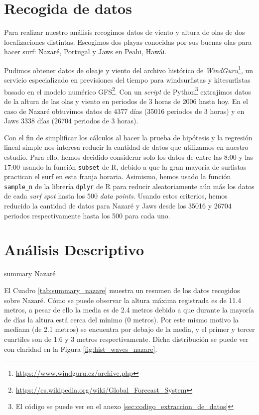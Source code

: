 \section{Recogida de datos}%
\label{sec:recogida_de_datos}
Para realizar nuestro análisis recogimos datos de viento y altura de olas de
dos localizaciones distintas. Escogimos dos playas conocidas por sus buenas
olas para hacer surf: Nazaré, Portugal y Jaws en Peahi, Hawái.

Pudimos obtener datos de oleaje y viento del archivo histórico de \emph{WindGuru}\footnote{\url{https://www.windguru.cz/archive.php}}, un servicio especializado en previsiones del tiempo para windsurfistas y kitesurfistas basado en el modelo numérico GFS\footnote{\url{https://es.wikipedia.org/wiki/Global_Forecast_System}}. Con un \textit{script} de
Python\footnote{El código se puede ver en el anexo
  \ref{sec:codigo_extraccion_de_datos}} extrajimos datos de la altura de las
olas y viento en periodos de 3 horas de 2006 hasta hoy. En el caso de Nazaré
obtuvimos datos de 4377 días (35016 periodos de 3 horas) y en Jaws 3338 días
(26704 periodos de 3 horas).

Con el fin de simplificar los cálculos al hacer la prueba de hipótesis y la regresión lineal simple nos interesa reducir la cantidad de datos que utilizamos en nuestro estudio. Para ello, hemos decidido considerar solo los datos de entre las 8:00 y las 17:00 usando la función \texttt{subset} de R, debido a que la gran mayoría de surfistas practican el surf en esta franja horaria. Asimismo, hemos usado la función \texttt{sample\_n} de la librería \texttt{dplyr} de R para reducir aleatoriamente aún más los datos de cada \textit{surf spot} hasta los 500 \textit{data points}. Usando estos criterios, hemos reducido la cantidad de datos para Nazaré y Jaws desde los 35016 y 26704 periodos respectivamente hasta los 500 para cada uno.

\section{Análisis Descriptivo}%
\label{sec:metodos}

\begin{table}[htbp]
\centering

\caption{summary Nazaré}
\label{tab:summary_nazare}
\end{table}

El Cuadro \ref{tab:summary_nazare} muestra un resumen de los datos recogidos sobre Nazaré. Cómo se puede observar la altura máxima registrada es de 11.4 metros, a pesar de ello la media es de 2.4 metros debido a que durante la mayoría de días la altura está cerca del mínimo (0 metros). Por este mismo motivo la mediana (de 2.1 metros) se encuentra por debajo de la media, y el primer y tercer cuartiles son de 1.6 y 3 metros respectivamente. Dicha distribución se puede ver con claridad en la Figura \ref{fig:hist_waves_nazare}.


